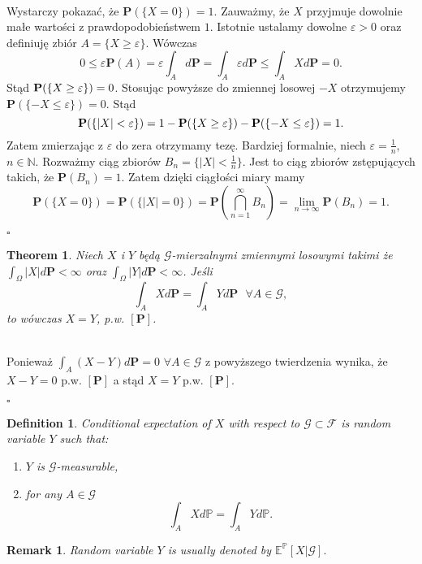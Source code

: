 \documentclass{book}
\newtheorem{definition}{Definition}[section]
\newtheorem{theorem}{Theorem}[section]
\newtheorem{remark}{Remark}[section]
\newenvironment{proof}
{{\bf Proof. }}{\begin{flushright}$\square$\end{flushright}}
\begin{document}
\begin{proof}\\
Wystarczy pokazać, że $\mathbf{P}(\{X=0\})=1$. Zauważmy, że $X$ przyjmuje dowolnie małe wartości z prawdopodobieństwem $1$. Istotnie ustalamy dowolne $\varepsilon>0$ oraz definiuję zbiór $A=\{X\geq \varepsilon\}$. Wówczas
\begin{equation}
\nonumber
0\leq\varepsilon\mathbf{P}(A)=\varepsilon\int_{A}d\mathbf{P}=\int_{A}\varepsilon d\mathbf{P}\leq\int_{A}Xd\mathbf{P}=0.
\end{equation}
Stąd $\mathbf{P}(\{X\geq\-\varepsilon\})=0$. Stosując powyższe do zmiennej losowej $-X$ otrzymujemy $\mathbf{P}(\{-X\leq\varepsilon\})=0$. Stąd
\begin{equation}
\nonumber
\mathbf{P}(\{|X|<\varepsilon\})=1-\mathbf{P}(\{X\geq\varepsilon\})-\mathbf{P}(\{-X\leq\-\varepsilon\})=1.
\end{equation}
Zatem zmierzając z $\varepsilon$ do zera otrzymamy tezę. Bardziej formalnie, niech $\varepsilon=\frac{1}{n}$, $n\in \mathbb{N}$. Rozważmy ciąg zbiorów $B_{n}=\{|X|<\frac{1}{n}\}$. Jest to ciąg zbiorów zstępujących takich, że $\mathbf{P}(B_{n})=1$. Zatem dzięki ciągłości miary mamy
\begin{equation}
\nonumber
\mathbf{P}(\{X=0\})=\mathbf{P}(\{|X|=0\})=\mathbf{P}\left(\bigcap _{n=1}^{\infty}B_{n}\right)=\lim_{n\to\infty}\mathbf{P}(B_{n})=1.
\end{equation}
\end{proof}
\begin{theorem}
\label{Ciri}
Niech $X$ i $Y$ będą $\mathcal{G}$-mierzalnymi zmiennymi losowymi takimi że $\int_{\varOmega}|X|d\mathbf{P}<\infty$ oraz $\int_{\varOmega}|Y|d\mathbf{P}<\infty$. Jeśli
\begin{equation}
\int_{A}Xd\mathbf{P}=\int_{A}Yd\mathbf{P}\ \ \ \forall A\in\mathcal{G},
\end{equation}
to wówczas $X=Y$, p.w. $[\mathbf{P}]$.
\end{theorem}
\begin{proof}\\
Ponieważ $\int_{A}(X-Y)d\mathbf{P}=0$ $\forall A\in\mathcal{G}$ z powyższego twierdzenia wynika, że $X-Y=0$ p.w. $[\mathbf{P}]$ a stąd $X=Y$ p.w. $[\mathbf{P}]$.
\end{proof}

\begin{definition}
Conditional expectation of $X$ with respect to $\mathcal{G}\subset\mathcal{F}$ is random variable $Y$ such that:
\begin{enumerate}
\item  $Y$ is $\mathcal{G}$-measurable,
\item for any $A \in \mathcal{G}$
\begin{equation}
\nonumber
\int_{A}Xd\mathbb{P}=\int_{A}Yd\mathbb{P}.
\end{equation}
\end{enumerate}
\end{definition}
\begin{remark}
Random variable $Y$ is usually denoted by $\mathbb{E}^{\mathbb{P}}[X|\mathcal{G}].$
 
\end{remark}
\end{document}
